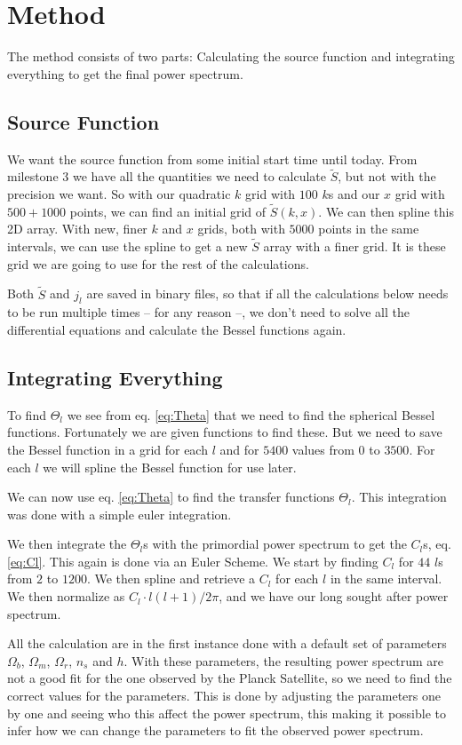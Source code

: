 \documentclass[a4paper,norsk, 10pt]{article}
\begin{document}
\section{Method}
The method consists of two parts: Calculating the source function and integrating everything to get the final power spectrum.

\subsection{Source Function}
We want the source function from some initial start time until today. From milestone 3 we have all the quantities we need to calculate $\tilde{S}$, but not with the precision we want. So with our quadratic $k$ grid with $100$ $k$s and our $x$ grid with $500+1000$ points, we can find an initial grid of $\tilde{S}(k,x)$. We can then spline this 2D array. With new, finer $k$ and $x$ grids, both with $5000$ points in the same intervals, we can use the spline to get a new $\tilde{S}$ array with a finer grid. It is these grid we are going to use for the rest of the calculations.

Both $\tilde{S}$ and $j_l$ are saved in binary files, so that if all the calculations below needs to be run multiple times -- for any reason --, we don't need to solve all the differential equations and calculate the Bessel functions again.

\subsection{Integrating Everything}
To find $\Theta_l$ we see from eq. \eqref{eq:Theta} that we need to find the spherical Bessel functions. Fortunately we are given functions to find these. But we need to save the Bessel function in a grid for each $l$ and for $5400$ values from $0$ to $3500$. For each $l$ we will spline the Bessel function for use later.

We can now use eq. \eqref{eq:Theta} to find the transfer functions $\Theta_l$. This integration was done with a simple euler integration. 

We then integrate the $\Theta_l$s with the primordial power spectrum to get the $C_l$s, eq. \eqref{eq:Cl}. This again is done via an Euler Scheme. We start by finding $C_l$ for $44$ $l$s from $2$ to $1200$. We then spline and retrieve a $C_l$ for each $l$ in the same interval. We then normalize as $C_l\cdot l(l+1)/2\pi$, and we have our long sought after power spectrum. 

All the calculation are in the first instance done with a default set of parameters $\Omega_b$, $\Omega_m$, $\Omega_r$, $n_s$ and $h$. With these parameters, the resulting power spectrum are not a good fit for the one observed by the Planck Satellite, so we need to find the correct values for the parameters. This is done by adjusting the parameters one by one and seeing who this affect the power spectrum, this making it possible to infer how we can change the parameters to fit the observed power spectrum.
\end{document}
